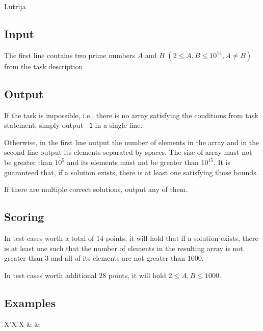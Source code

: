 \begin{statement}[
  problempoints=70,
  timelimit=1 second,
  memorylimit=512 MiB,
]{Lutrija}
\subsection*{Input}
The first line contains two prime numbers $A$ and $B$
$(2 \le A, B \le 10^{14}, A \ne B)$ from the task description.

\subsection*{Output}
If the task is impossible, i.e., there is no array satisfying the conditions
from task statement, simply output \texttt{-1} in a single line.

Otherwise, in the first line output the number of elements in the array and in
the second line output its elements separated by spaces. The size of array must
not be greater than $10^5$ and its elements must not be greater than $10^{15}$.
It is guaranteed that, if a solution exists, there is at least one satisfying
those bounds.

If there are multiple correct solutions, output any of them.

\subsection*{Scoring}
In test cases worth a total of $14$ points, it will hold that if a solution
exists, there is at least one such that the number of elements in the resulting
array is not greater than $3$ and all of its elements are not greater than $1000$.

In test cases worth additional $28$ points, it will hold $2 \le A, B \le 1000$.

\subsection*{Examples}
\begin{tabularx}{\textwidth}{X'X'X}
 &
 &
\end{tabularx}

\end{statement}

